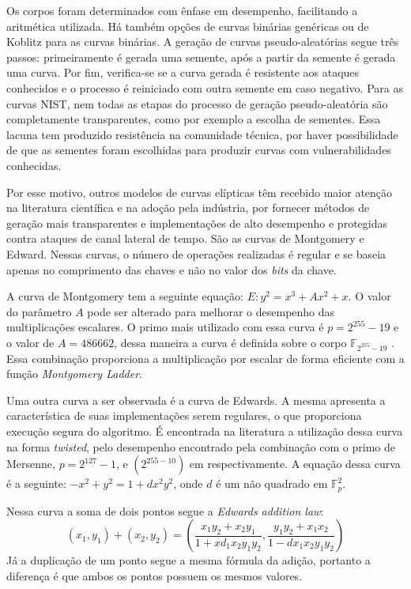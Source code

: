 Os corpos foram determinados com ênfase em desempenho, facilitando a aritmética utilizada. Há também opções de curvas binárias genéricas ou de Koblitz para as curvas binárias. A geração de curvas pseudo-aleatórias segue três passos: primeiramente é gerada uma semente, após a partir da semente é gerada uma curva. Por fim, verifica-se se a curva gerada é resistente aos ataques conhecidos e o processo é reiniciado com outra semente em caso negativo. Para as curvas NIST, nem todas as etapas do processo de geração pseudo-aleatória são completamente transparentes, como por exemplo a escolha de sementes. Essa lacuna tem produzido resistência na comunidade técnica, por haver possibilidade de que as sementes foram escolhidas para produzir curvas com vulnerabilidades conhecidas.

Por esse motivo, outros modelos de curvas elípticas têm recebido maior atenção na literatura científica e na adoção pela indústria, por fornecer métodos de geração mais transparentes e implementações de alto desempenho e protegidas contra ataques de canal lateral de tempo. São as curvas de Montgomery e Edward. Nessas curvas, o número de operações realizadas é regular e se baseia apenas no comprimento das chaves e não no valor dos \emph{bits} da chave.

A curva de Montgomery tem a seguinte equação: $E: y^2 = x^3 + Ax^2 + x$. O valor do parâmetro $A$ pode ser alterado para melhorar o desempenho das multiplicações escalares. O primo mais utilizado com essa curva é $p = 2^{255}-19$ e o valor de $A = 486662$, dessa maneira a curva é definida sobre o corpo $\mathbb{F}_{2^{255}-19}$ \cite{Dull:2015:HCM:2834659.2834708}. Essa combinação proporciona a multiplicação por escalar de forma eficiente com a função \emph{Montgomery Ladder}.

Uma outra curva a ser observada é a curva de Edwards. A mesma apresenta a característica de suas implementações serem regulares, o que proporciona execução segura do algoritmo. É encontrada na literatura a utilização dessa curva na forma \textit{twisted}, pelo desempenho encontrado pela combinação com o primo de Mersenne, $p = 2^{127} - 1$, e $(2^{255 - 10})$ em \cite{longa:2015, Bernstein2012} respectivamente. A equação dessa curva é a seguinte: $-x^2 + y^2 = 1 + dx^2y^2$, onde $d$ é um não quadrado em $\mathbb{F}_p^2$.

Nessa curva a soma de dois pontos segue a \textit{Edwards addition law}:
$$ (x_1,y_1) + (x_2,y_2) = (\frac{x_1y_2 + x_2y_1}{1 + xd_1x_2y_1y_2},\frac{y_1y_2 + x_1x_2}{1 - dx_1x_2y_1y_2}) $$
Já a duplicação de um ponto segue a mesma fórmula da adição, portanto a diferença é que ambos os pontos possuem os mesmos valores.


